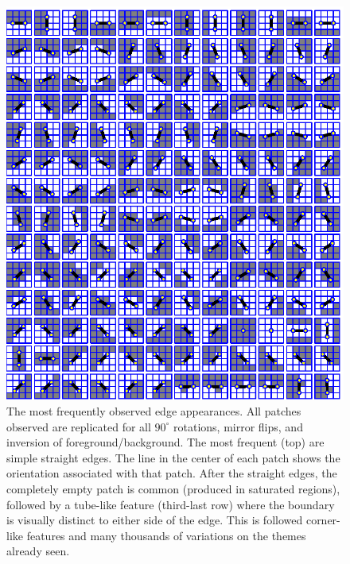\begin{figure}[tb]
\begin{center}
\includegraphics[width=\columnwidth]{seen-all}
\caption{
\label{fig:lines-all}
%
The most frequently observed edge appearances.  All patches
observed are replicated for all $90^{\circ}$ rotations, mirror flips,
and inversion of foreground/background.
%
The most frequent (top) are simple straight edges.
%
The line in the center of
each patch shows the orientation associated with that patch.  
%
After the straight edges, the completely empty patch
is common (produced in saturated regions), 
followed by a tube-like feature (third-last row)
where the boundary is visually distinct to either side of
the edge.
This is followed corner-like features and
many thousands of variations on the themes already seen.  
%
}
\end{center}
\end{figure}
